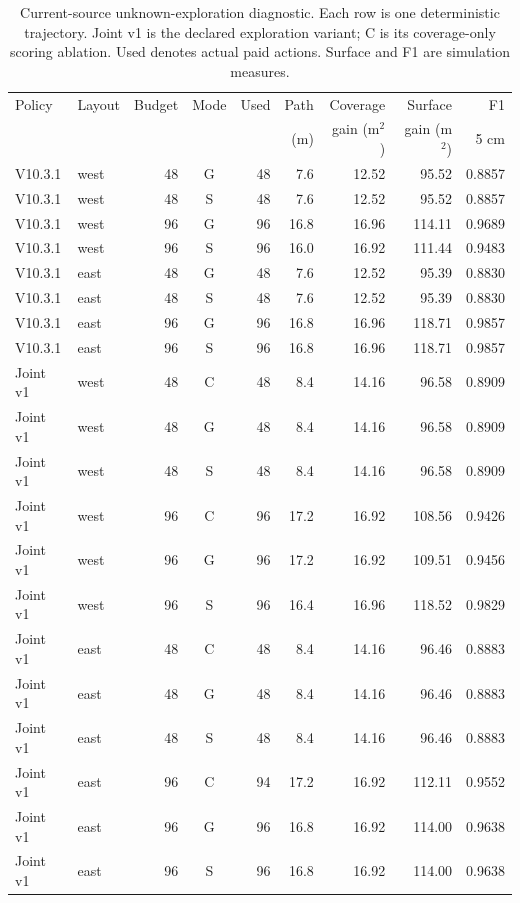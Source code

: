 \begin{table}[!htbp]
\centering
\caption{Current-source unknown-exploration diagnostic. Each row is one deterministic trajectory. Joint v1 is the declared exploration variant; C is its coverage-only scoring ablation. Used denotes actual paid actions. Surface and F1 are simulation measures.}\label{tab:8}
\small\setlength{\tabcolsep}{3pt}
\begin{tabular}{@{}llrcrrrrr@{}}
\toprule
Policy & Layout & Budget & Mode & Used & Path & Coverage & Surface & F1\\
 & & & & & (m) & gain (m$^2$) & gain (m$^2$) & 5 cm\\
\midrule
V10.3.1 & west & 48 & G & 48 & 7.6 & 12.52 & 95.52 & 0.8857 \\
V10.3.1 & west & 48 & S & 48 & 7.6 & 12.52 & 95.52 & 0.8857 \\
V10.3.1 & west & 96 & G & 96 & 16.8 & 16.96 & 114.11 & 0.9689 \\
V10.3.1 & west & 96 & S & 96 & 16.0 & 16.92 & 111.44 & 0.9483 \\
V10.3.1 & east & 48 & G & 48 & 7.6 & 12.52 & 95.39 & 0.8830 \\
V10.3.1 & east & 48 & S & 48 & 7.6 & 12.52 & 95.39 & 0.8830 \\
V10.3.1 & east & 96 & G & 96 & 16.8 & 16.96 & 118.71 & 0.9857 \\
V10.3.1 & east & 96 & S & 96 & 16.8 & 16.96 & 118.71 & 0.9857 \\
\midrule
Joint v1 & west & 48 & C & 48 & 8.4 & 14.16 & 96.58 & 0.8909 \\
Joint v1 & west & 48 & G & 48 & 8.4 & 14.16 & 96.58 & 0.8909 \\
Joint v1 & west & 48 & S & 48 & 8.4 & 14.16 & 96.58 & 0.8909 \\
Joint v1 & west & 96 & C & 96 & 17.2 & 16.92 & 108.56 & 0.9426 \\
Joint v1 & west & 96 & G & 96 & 17.2 & 16.92 & 109.51 & 0.9456 \\
Joint v1 & west & 96 & S & 96 & 16.4 & 16.96 & 118.52 & 0.9829 \\
Joint v1 & east & 48 & C & 48 & 8.4 & 14.16 & 96.46 & 0.8883 \\
Joint v1 & east & 48 & G & 48 & 8.4 & 14.16 & 96.46 & 0.8883 \\
Joint v1 & east & 48 & S & 48 & 8.4 & 14.16 & 96.46 & 0.8883 \\
Joint v1 & east & 96 & C & 94 & 17.2 & 16.92 & 112.11 & 0.9552 \\
Joint v1 & east & 96 & G & 96 & 16.8 & 16.92 & 114.00 & 0.9638 \\
Joint v1 & east & 96 & S & 96 & 16.8 & 16.92 & 114.00 & 0.9638 \\
\bottomrule
\end{tabular}
\end{table}
